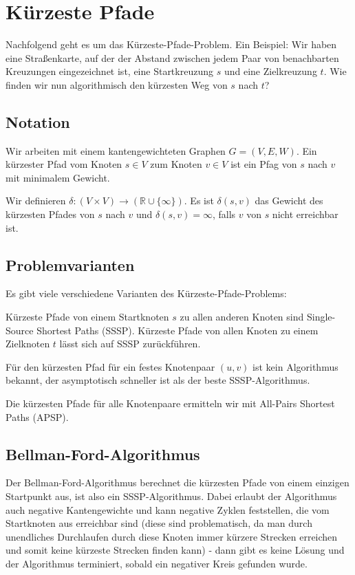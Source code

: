 \documentclass[12pt]{article}
\begin{document}
\section{Kürzeste Pfade}

Nachfolgend geht es um das Kürzeste-Pfade-Problem. Ein Beispiel: Wir haben eine Straßenkarte, auf der der Abstand zwischen jedem Paar von benachbarten Kreuzungen eingezeichnet ist, eine Startkreuzung $s$ und eine Zielkreuzung $t$. Wie finden wir nun algorithmisch den kürzesten Weg von $s$ nach $t$?

\subsection{Notation}

Wir arbeiten mit einem kantengewichteten Graphen $G = (V, E, W)$. Ein kürzester Pfad vom Knoten $s \in V$ zum Knoten $v \in V$ ist ein Pfag von $s$ nach $v$ mit minimalem Gewicht.

Wir definieren $\delta: (V \times V) \rightarrow (\mathbb{R} \cup \{\infty\})$. Es ist $\delta(s, v)$ das Gewicht des kürzesten Pfades von $s$ nach $v$ und $\delta(s, v) = \infty$, falls $v$ von $s$ nicht erreichbar ist.

\subsection{Problemvarianten}

Es gibt viele verschiedene Varianten des Kürzeste-Pfade-Problems:

Kürzeste Pfade von einem Startknoten $s$ zu allen anderen Knoten sind Single-Source Shortest Paths (SSSP). Kürzeste Pfade von allen Knoten zu einem Zielknoten $t$ lässt sich auf SSSP zurückführen.

Für den kürzesten Pfad für ein festes Knotenpaar $(u, v)$ ist kein Algorithmus bekannt, der asymptotisch schneller ist als der beste SSSP-Algorithmus.

Die kürzesten Pfade für alle Knotenpaare ermitteln wir mit All-Pairs Shortest Paths (APSP).

\subsection{Bellman-Ford-Algorithmus}

Der Bellman-Ford-Algorithmus berechnet die kürzesten Pfade von einem einzigen Startpunkt aus, ist also ein SSSP-Algorithmus. Dabei erlaubt der Algorithmus auch negative Kantengewichte und kann negative Zyklen feststellen, die vom Startknoten aus erreichbar sind (diese sind problematisch, da man durch unendliches Durchlaufen durch diese Knoten immer kürzere Strecken erreichen und somit keine kürzeste Strecken finden kann) - dann gibt es keine Lösung und der Algorithmus terminiert, sobald ein negativer Kreis gefunden wurde.
\end{document}

